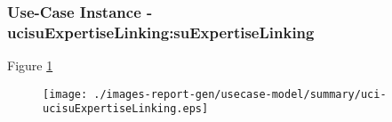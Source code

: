 
	\subsubsection{Use-Case Instance - ucisuExpertiseLinking:suExpertiseLinking}
	
	\begin{operationmodel}
	
	\end{operationmodel} 

	
	Figure \ref{fig:lu.uni.lassy.excalibur.examples.icrash-RE-UC-uci-ucisuExpertiseLinking}
	
	\begin{figure}[htbp]
	\begin{center}
	
	\texttt{[image: ./images-report-gen/usecase-model/summary/uci-ucisuExpertiseLinking.eps]}
	\end{center}
	\caption[lu.uni.lassy.excalibur.examples.icrash Sequence Diagram: uci-ucisuExpertiseLinking]{}
	\label{fig:lu.uni.lassy.excalibur.examples.icrash-RE-UC-uci-ucisuExpertiseLinking}
	\end{figure}
	\vspace{0.5cm}
